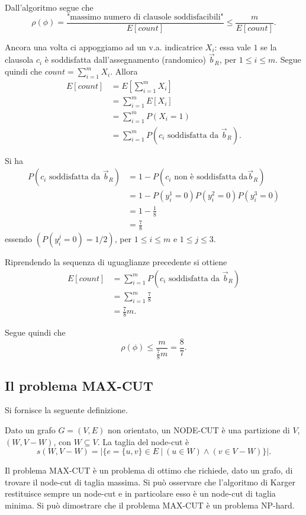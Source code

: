 Dall'algoritmo segue che
\[
\rho(\phi)=\frac{\text{"massimo numero di clausole soddisfacibili"}}{E[count]}\leq\frac{m}{E[count]}.
\]

Ancora una volta ci appoggiamo ad un v.a. indicatrice $X_i$: essa vale $1$ se la clausola $c_i$ è soddisfatta dall'assegnamento (randomico) $\vec{b}_R$, per $1\leq i\leq m$. Segue quindi che $count=\sum_{i=1}^mX_i$. Allora
\begin{align*}
E[count]&=E\left[\sum_{i=1}^mX_i\right] \\
&=\sum_{i=1}^mE[X_i] \\
&=\sum_{i=1}^mP(X_i=1) \\
&=\sum_{i=1}^mP(c_i \text{ soddisfatta da } \vec{b}_R).
\end{align*}

Si ha
\begin{align*}
P(c_i \text{ soddisfatta da } \vec{b}_R)&=1-P(c_i \text{ non è soddisfatta da} \vec{b}_R) \\
&=1-P(y_i^1=0)P(y_i^2=0)P(y_i^3=0)  \\
&=1-\frac{1}{8} \\
&=\frac{7}{8}
\end{align*}
essendo $(P(y_i^j=0)=1/2)$, per $1\leq i\leq m$ e $1\leq j\leq 3$.

Riprendendo la sequenza di uguaglianze precedente si ottiene
\begin{align*}
E[count]&=\sum_{i=1}^mP(c_i \text{ soddisfatta da } \vec{b}_R) \\
&=\sum_{i=1}^m\frac{7}{8} \\
&=\frac{7}{8}m.
\end{align*}

Segue quindi che
\[
\rho(\phi)\leq\frac{m}{\frac{7}{8}m}=\frac{8}{7}.
\]

\subsection{Il problema MAX-CUT}
Si fornisce la seguente definizione.

\begin{definizione}
Dato un grafo $G=(V,E)$ non orientato, un NODE-CUT è una partizione di $V$, $(W,V-W)$, con $W\subseteq V$. La taglia del node-cut è
\[
s(W,V-W)=|\{e=\{u,v\}\in E\ |\ (u\in W) \land (v\in V-W)\}|.
\]
\end{definizione}

Il problema MAX-CUT è un problema di ottimo che richiede, dato un grafo, di trovare il node-cut di taglia massima. Si può osservare che l'algoritmo di Karger restituisce sempre un node-cut e in particolare esso è un node-cut di taglia minima. Si può dimostrare che il problema MAX-CUT è un problema NP-hard.

